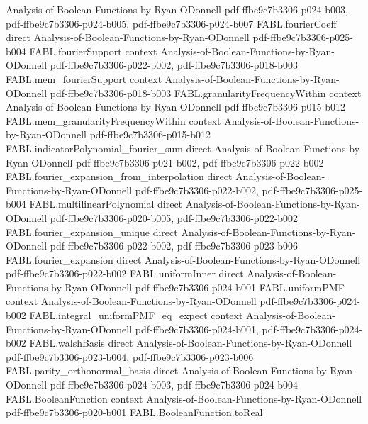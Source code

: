 \begin{theorem}
  {Analysis-of-Boolean-Functions-by-Ryan-ODonnell}
  {pdf-ffbe9c7b3306-p024-b003,
    pdf-ffbe9c7b3306-p024-b005,
    pdf-ffbe9c7b3306-p024-b007}
\proofstep
  {FABL.fourierCoeff}
  {direct}
  {Analysis-of-Boolean-Functions-by-Ryan-ODonnell}
  {pdf-ffbe9c7b3306-p025-b004}
\proofstep
  {FABL.fourierSupport}
  {context}
  {Analysis-of-Boolean-Functions-by-Ryan-ODonnell}
  {pdf-ffbe9c7b3306-p022-b002,
    pdf-ffbe9c7b3306-p018-b003}
\proofstep
  {FABL.mem_fourierSupport}
  {context}
  {Analysis-of-Boolean-Functions-by-Ryan-ODonnell}
  {pdf-ffbe9c7b3306-p018-b003}
\proofstep
  {FABL.granularityFrequencyWithin}
  {context}
  {Analysis-of-Boolean-Functions-by-Ryan-ODonnell}
  {pdf-ffbe9c7b3306-p015-b012}
\proofstep
  {FABL.mem_granularityFrequencyWithin}
  {context}
  {Analysis-of-Boolean-Functions-by-Ryan-ODonnell}
  {pdf-ffbe9c7b3306-p015-b012}
\proofstep
  {FABL.indicatorPolynomial_fourier_sum}
  {direct}
  {Analysis-of-Boolean-Functions-by-Ryan-ODonnell}
  {pdf-ffbe9c7b3306-p021-b002,
    pdf-ffbe9c7b3306-p022-b002}
\proofstep
  {FABL.fourier_expansion_from_interpolation}
  {direct}
  {Analysis-of-Boolean-Functions-by-Ryan-ODonnell}
  {pdf-ffbe9c7b3306-p022-b002,
    pdf-ffbe9c7b3306-p025-b004}
\proofstep
  {FABL.multilinearPolynomial}
  {direct}
  {Analysis-of-Boolean-Functions-by-Ryan-ODonnell}
  {pdf-ffbe9c7b3306-p020-b005,
    pdf-ffbe9c7b3306-p022-b002}
\proofstep
  {FABL.fourier_expansion_unique}
  {direct}
  {Analysis-of-Boolean-Functions-by-Ryan-ODonnell}
  {pdf-ffbe9c7b3306-p022-b002,
    pdf-ffbe9c7b3306-p023-b006}
\proofstep
  {FABL.fourier_expansion}
  {direct}
  {Analysis-of-Boolean-Functions-by-Ryan-ODonnell}
  {pdf-ffbe9c7b3306-p022-b002}
\proofstep
  {FABL.uniformInner}
  {direct}
  {Analysis-of-Boolean-Functions-by-Ryan-ODonnell}
  {pdf-ffbe9c7b3306-p024-b001}
\proofstep
  {FABL.uniformPMF}
  {context}
  {Analysis-of-Boolean-Functions-by-Ryan-ODonnell}
  {pdf-ffbe9c7b3306-p024-b002}
\proofstep
  {FABL.integral_uniformPMF_eq_expect}
  {context}
  {Analysis-of-Boolean-Functions-by-Ryan-ODonnell}
  {pdf-ffbe9c7b3306-p024-b001,
    pdf-ffbe9c7b3306-p024-b002}
\proofstep
  {FABL.walshBasis}
  {direct}
  {Analysis-of-Boolean-Functions-by-Ryan-ODonnell}
  {pdf-ffbe9c7b3306-p023-b004,
    pdf-ffbe9c7b3306-p023-b006}
\proofstep
  {FABL.parity_orthonormal_basis}
  {direct}
  {Analysis-of-Boolean-Functions-by-Ryan-ODonnell}
  {pdf-ffbe9c7b3306-p024-b003,
    pdf-ffbe9c7b3306-p024-b004}
\proofstep
  {FABL.BooleanFunction}
  {context}
  {Analysis-of-Boolean-Functions-by-Ryan-ODonnell}
  {pdf-ffbe9c7b3306-p020-b001}
\proofstep
  {FABL.BooleanFunction.toReal}

\end{theorem}
